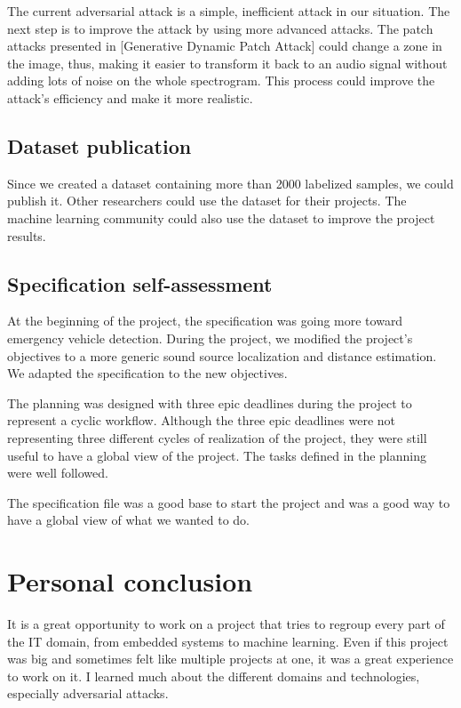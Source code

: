 The current adversarial attack is a simple, inefficient attack in our situation. The next step is to improve the attack by using more advanced attacks. The patch attacks presented in [Generative Dynamic Patch Attack]\cite{li2021generative} could change a zone in the image, thus, making it easier to transform it back to an audio signal without adding lots of noise on the whole spectrogram. This process could improve the attack's efficiency and make it more realistic.

\subsection{Dataset publication}

Since we created a dataset containing more than 2000 labelized samples, we could publish it. Other researchers could use the dataset for their projects. The machine learning community could also use the dataset to improve the project results.

\subsection{Specification self-assessment}

At the beginning of the project, the specification was going more toward emergency vehicle detection. During the project, we modified the project's objectives to a more generic sound source localization and distance estimation. We adapted the specification to the new objectives. 

The planning was designed with three epic deadlines during the project to represent a cyclic workflow. Although the three epic deadlines were not representing three different cycles of realization of the project, they were still useful to have a global view of the project. The tasks defined in the planning were well followed.

The specification file was a good base to start the project and was a good way to have a global view of what we wanted to do.

\section{Personal conclusion}

It is a great opportunity to work on a project that tries to regroup every part of the IT domain, from embedded systems to machine learning. Even if this project was big and sometimes felt like multiple projects at one, it was a great experience to work on it. I learned much about the different domains and technologies, especially adversarial attacks.









